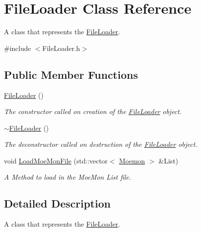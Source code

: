 \hypertarget{class_file_loader}{\section{File\+Loader Class Reference}
\label{class_file_loader}
}


A class that represents the \hyperlink{class_file_loader}{File\+Loader}.  




{\ttfamily \#include $<$File\+Loader.\+h$>$}

\subsection*{Public Member Functions}
\begin{DoxyCompactItemize}
\item 
\hypertarget{class_file_loader_a51313b536560d1d89d8350475d2bc749}{\hyperlink{class_file_loader_a51313b536560d1d89d8350475d2bc749}{File\+Loader} ()}\label{class_file_loader_a51313b536560d1d89d8350475d2bc749}

\begin{DoxyCompactList}\small\item\em The constructor called on creation of the \hyperlink{class_file_loader}{File\+Loader} object. \end{DoxyCompactList}\item 
\hypertarget{class_file_loader_a0954776182dd01364bdb216539ce398b}{\hyperlink{class_file_loader_a0954776182dd01364bdb216539ce398b}{$\sim$\+File\+Loader} ()}\label{class_file_loader_a0954776182dd01364bdb216539ce398b}

\begin{DoxyCompactList}\small\item\em The deconstructor called on destruction of the \hyperlink{class_file_loader}{File\+Loader} object. \end{DoxyCompactList}\item 
void \hyperlink{class_file_loader_a128e6e80d64d9f045107da35c74a216f}{Load\+Moe\+Mon\+File} (std\+::vector$<$ \hyperlink{class_moemon}{Moemon} $>$ \&List)
\begin{DoxyCompactList}\small\item\em A Method to load in the Moe\+Mon List file. \end{DoxyCompactList}\end{DoxyCompactItemize}


\subsection{Detailed Description}
A class that represents the \hyperlink{class_file_loader}{File\+Loader}. 

